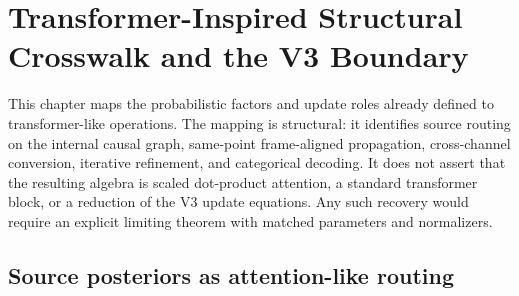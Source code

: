 \chapter[Transformer-Inspired Structural Crosswalk and the V3 Boundary]{Transformer-Inspired Structural\\Crosswalk and the V3 Boundary}

This chapter maps the probabilistic factors and update roles already defined to transformer-like operations. The mapping is structural: it identifies source routing on the internal causal graph, same-point frame-aligned propagation, cross-channel conversion, iterative refinement, and categorical decoding. It does not assert that the resulting algebra is scaled dot-product attention, a standard transformer block, or a reduction of the V3 update equations. Any such recovery would require an explicit limiting theorem with matched parameters and normalizers.

\section{Source posteriors as attention-like routing}

